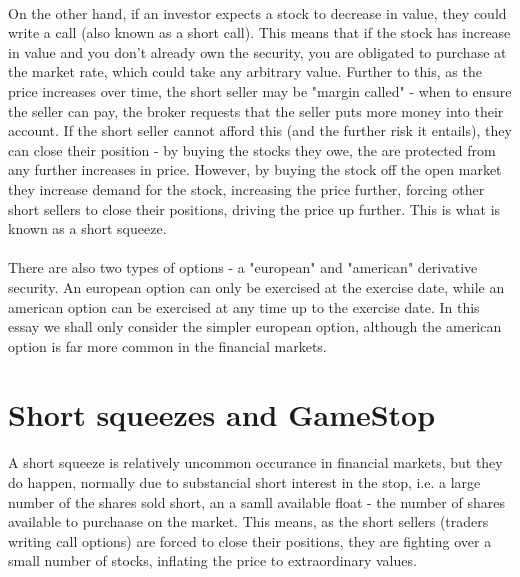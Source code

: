 \documentclass[11pt]{article} %
\begin{document}
\paragraph{}
On the other hand, if an investor expects a stock to decrease 
in value, they could write a call (also known as a short call). This 
means that if the stock has increase in value and you don't already own 
the security, you are obligated to purchase at the market rate, which 
could take any arbitrary value. Further to this, as the price increases 
over time, the short seller may be "margin called" - when to ensure the 
seller can pay, the broker requests that the seller puts more money into 
their account. If the short seller cannot afford this (and the further 
risk it entails), they can close their position - by buying the stocks 
they owe, the are protected from any further increases in price. However, 
by buying the stock off the open market they increase demand for the 
stock, increasing the price further, forcing other short sellers to 
close their positions, driving the price up further. This is what is 
known as a short squeeze.
\paragraph{}\label{typesofoption}
There are also two types of options - a "european" and "american" 
derivative security. An european option can only be exercised at the 
exercise date, while an american option can be exercised at any time up 
to the exercise date. In this essay we shall only consider the simpler 
european option, although the american option is far more common in 
the financial markets.

\section{Short squeezes and GameStop}
A short squeeze is relatively uncommon occurance in financial markets, but they do 
happen, normally due to substancial short interest in the stop, i.e. a large number 
of the shares sold short, an a samll available float - the number of shares 
available to purchaase on the market. This means, as the short sellers (traders 
writing call options) are forced to close their positions, they are fighting over 
a small number of stocks, inflating the price to extraordinary values. 
\end{document}
